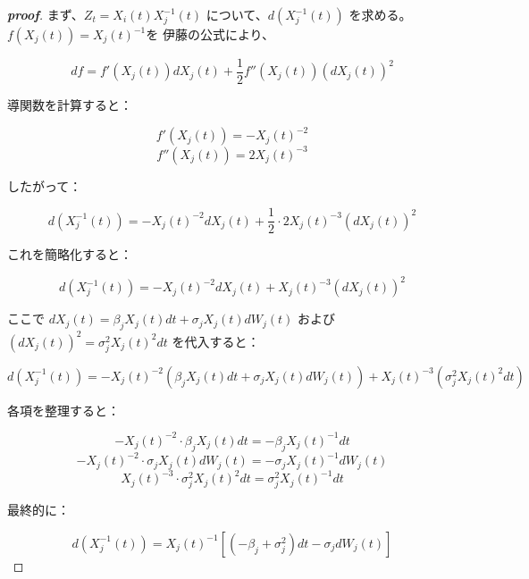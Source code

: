 \documentclass[a4paper,11pt]{jsarticle}
\begin{document}
\begin{proof}[\textbf{proof}]

まず、$Z_t = X_i(t)X_j^{-1}(t)$ について、$d(X_j^{-1}(t))$ を求める。\\  

$f(X_j(t)) = X_j(t)^{-1}を$ 伊藤の公式により、  

\[  
df = f'(X_j(t))dX_j(t) + \frac{1}{2}f''(X_j(t))(dX_j(t))^2  
\]  

導関数を計算すると：  

\[  
f'(X_j(t)) = -X_j(t)^{-2}  
\]  
\[  
f''(X_j(t)) = 2X_j(t)^{-3}  
\]  

したがって：  

\[  
d(X_j^{-1}(t)) = -X_j(t)^{-2}dX_j(t) + \frac{1}{2} \cdot 2X_j(t)^{-3}(dX_j(t))^2  
\]  

これを簡略化すると：  

\[  
d(X_j^{-1}(t)) = -X_j(t)^{-2}dX_j(t) + X_j(t)^{-3}(dX_j(t))^2  
\]  

ここで $dX_j(t) = \beta_jX_j(t)dt + \sigma_jX_j(t)dW_j(t)$ および $(dX_j(t))^2 = \sigma_j^2X_j(t)^2dt$ を代入すると：  

\[  
d(X_j^{-1}(t)) = -X_j(t)^{-2}(\beta_jX_j(t)dt + \sigma_jX_j(t)dW_j(t)) + X_j(t)^{-3}(\sigma_j^2X_j(t)^2dt)  
\]  

各項を整理すると：  

\[  
-X_j(t)^{-2} \cdot \beta_jX_j(t)dt = -\beta_jX_j(t)^{-1}dt  
\]  
\[  
-X_j(t)^{-2} \cdot \sigma_jX_j(t)dW_j(t) = -\sigma_jX_j(t)^{-1}dW_j(t)  
\]  
\[  
X_j(t)^{-3} \cdot \sigma_j^2X_j(t)^2dt = \sigma_j^2X_j(t)^{-1}dt  
\]  

最終的に：  

\[  
d(X_j^{-1}(t)) = X_j(t)^{-1}[(-\beta_j + \sigma_j^2)dt - \sigma_jdW_j(t)]  
\]
  
\end{proof}
\end{document}
